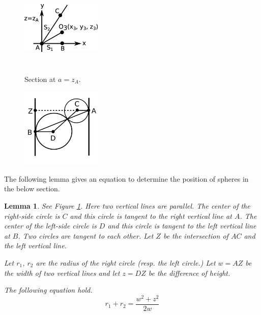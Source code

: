 \documentclass[suppldata, dvipdfmx]{interact}
\theoremstyle{plain}%
\newtheorem{lemma}[theorem]{Lemma}
\theoremstyle{definition}
\theoremstyle{remark}
\theoremstyle{problemstyle}
\begin{document}
\begin{figure}[h!tbp]
  \begin{minipage}[t]{0.5\textwidth}
 \centering
 \includegraphics[width=1.5in, height=1.5in,
 keepaspectratio]{./img/HexahedraWithSphericalFaces/sectionAtVertex.jpg}
 \caption{Section at $a=z_A$.}
 \label{fig:sectionAtVertex}
   \hspace*{\fill}
 \end{minipage}
 \begin{minipage}[t]{0.5\textwidth}
  \includegraphics[width=1.5in, height=1.5in,
  keepaspectratio]{./img/HexahedraWithSphericalFaces/twoCirclesSlice.jpg}
 \caption{}
 \label{fig:twoCirclesChain}
 \end{minipage}
\end{figure}

The following lemma gives an equation to determine the position of spheres in the below section.

\begin{lemma} \label{lemma:twoCirclesChain}
See Figure \ref{fig:twoCirclesChain}.  Here two vertical lines are parallel.  The center of the right-side circle is $C$ and this circle is tangent to the right vertical line at $A$.  The center of the left-side circle is $D$ and this circle is tangent to the left vertical line at $B$.  Two circles are tangent to each other.  Let $Z$ be the intersection of $AC$ and the left vertical line.\par
Let $r_1$, $r_2$ are the radius of the right circle (resp. the left circle.)  Let $w=AZ$ be the width of two vertical lines and let $z=DZ$ be the difference of height.\par
The following equation hold.
\[
r_1+r_2=\dfrac{w^2+z^2}{2w}
\]
\end{lemma}
\end{document}
